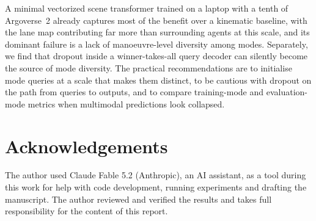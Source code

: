 \documentclass[10pt]{article}
\begin{document}
A minimal vectorized scene transformer trained on a laptop with a tenth of Argoverse~2 already
captures most of the benefit over a kinematic baseline, with the lane map contributing far
more than surrounding agents at this scale, and its dominant failure is a lack of
manoeuvre-level diversity among modes. Separately, we find that dropout inside a
winner-takes-all query decoder can silently become the source of mode diversity. The practical
recommendations are to initialise mode queries at a scale that makes them distinct, to be
cautious with dropout on the path from queries to outputs, and to compare training-mode and
evaluation-mode metrics when multimodal predictions look collapsed.

\section*{Acknowledgements}

The author used Claude Fable 5.2 (Anthropic), an AI assistant, as a tool during this work for
help with code development, running experiments and drafting the manuscript. The author
reviewed and verified the results and takes full responsibility for the content of this
report.



\end{document}
